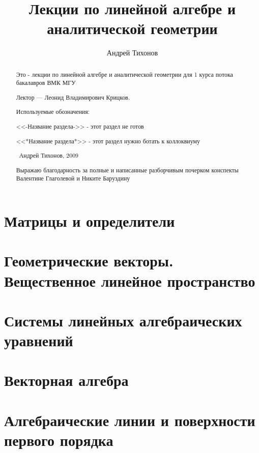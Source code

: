 \documentclass[draft]{report}
\title{Лекции по линейной алгебре и аналитической геометрии}
\theoremstyle{remark}
\begin{document}
\author{Андрей Тихонов}
\maketitle
\begin{abstract}
Это - лекции по линейной алгебре и аналитической геометрии для 1 курса потока бакалавров ВМК МГУ

Лектор --- Леонид Владимирович Крицков.

Используемые обозначения:

<<-Название раздела->> - этот раздел не готов

<<*Название раздела*>> - этот раздел нужно ботать к коллоквиуму

\textcopyright\ Андрей Тихонов, 2009

Выражаю благодарность за полные и написанные разборчивым почерком конспекты Валентине Глаголевой и Никите Баруздину
\end{abstract}
\tableofcontents
\part{Матрицы и определители}

\part{Геометрические векторы. Вещественное линейное пространство}

\part{Системы линейных алгебраических уравнений}

\part{Векторная алгебра}

\part{Алгебраические линии и поверхности первого порядка}

\end{document}
